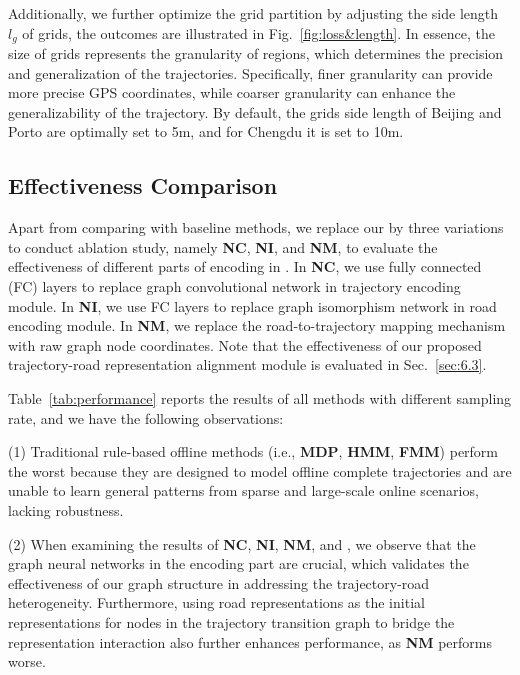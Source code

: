 Additionally, we further optimize the grid partition by adjusting the side length $l_g$ of grids, the outcomes are illustrated in Fig.~\ref{fig:loss&length}. In essence, the size of grids represents the granularity of regions, which determines the precision and generalization of the trajectories. Specifically, finer granularity can provide more precise GPS coordinates, while coarser granularity can enhance the generalizability of the trajectory. By default, the grids side length of Beijing and Porto are optimally set to 5m, and for Chengdu it is set to 10m.


\subsection{Effectiveness Comparison}
Apart from comparing \textbf{\modelName} with baseline methods, we replace our \textbf{\modelName} by three variations to conduct ablation study, namely \textbf{NC}, \textbf{NI}, and \textbf{NM}, to evaluate the effectiveness of different parts of encoding in \textbf{\modelName}. In \textbf{NC}, we use fully connected (FC) layers to replace graph convolutional network in trajectory encoding module. In \textbf{NI}, we use FC layers to replace graph isomorphism network in road encoding module. In \textbf{NM}, we replace the road-to-trajectory mapping mechanism with raw graph node coordinates. Note that the effectiveness of our proposed trajectory-road representation alignment module is evaluated in Sec.~\ref{sec:6.3}.

Table~\ref{tab:performance} reports the results of all methods with different sampling rate, and we have the following observations:

\noindent (1) Traditional rule-based offline methods (i.e., \textbf{MDP}, \textbf{HMM}, \textbf{FMM}) perform the worst because they are designed to model offline complete trajectories and are unable to learn general patterns from sparse and large-scale online scenarios, lacking robustness.

\noindent (2) When examining the results of \textbf{NC}, \textbf{NI}, \textbf{NM}, and \textbf{\modelName}, we observe that the graph neural networks in the encoding part are crucial, which validates the effectiveness of our graph structure in addressing the trajectory-road heterogeneity. Furthermore, using road representations as the initial representations for nodes in the trajectory transition graph to bridge the representation interaction also further enhances performance, as \textbf{NM} performs worse.

